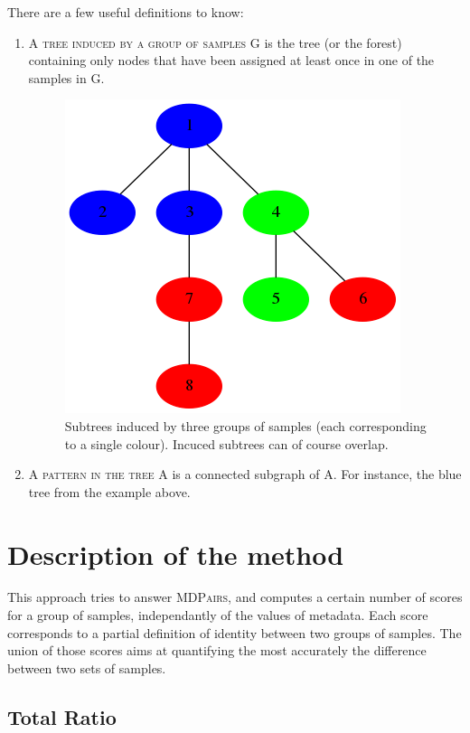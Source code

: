 \documentclass{report}
\begin{document}
There are a few useful definitions to know:
\begin{enumerate}
\item \textsc{A tree induced by a group of samples G} is the tree (or the forest) containing only nodes that have been assigned at least once in one of the samples in \textsc{G}.

\begin{figure}[H]
\centering
\includegraphics[scale=0.5]{illustrations/inducedtree.png}
\caption{Subtrees induced by three groups of samples (each corresponding to a single colour). Incuced subtrees can of course overlap.}
\end{figure}

\item \textsc{A pattern in the tree A} is a connected subgraph of \textsc{A}. For instance, the blue tree from the example above.
\end{enumerate}

\newpage

\section{Description of the method}

This approach tries to answer \textsc{MDPairs}, and computes a certain number of scores for a group of samples, independantly of the values of metadata. Each score corresponds to a partial definition of identity between two groups of samples. The union of those scores aims at quantifying the most accurately the difference between two sets of samples.

\subsection{Total Ratio}
\end{document}

